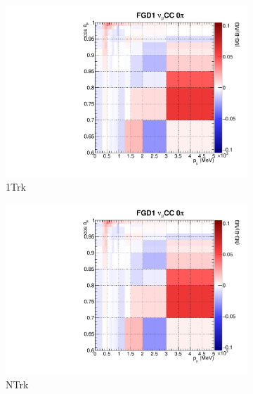 \begin{figure}
	\begin{subfigure}[t]{0.24\textwidth}
		\includegraphics[width=\textwidth, trim={0mm 0mm 10mm 7mm}, clip, page=21]{figures/mach3/banff/postfit_comp}
		\caption{1Trk}
	\end{subfigure}
	\begin{subfigure}[t]{0.24\textwidth}
		\includegraphics[width=\textwidth, trim={0mm 0mm 10mm 7mm}, clip, page=24]{figures/mach3/banff/postfit_comp}
		\caption{NTrk}
	\end{subfigure}
	\begin{subfigure}[t]{0.24\textwidth}

\end{subfigure}
\end{figure}
